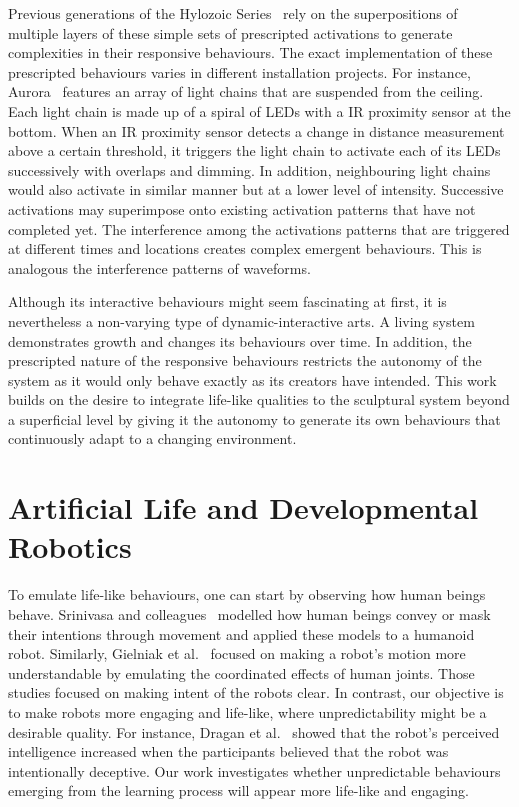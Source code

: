 Previous generations of the Hylozoic Series~\cite{Beesley2012} rely on the superpositions of multiple layers of these simple sets of prescripted activations to generate complexities in their responsive behaviours. The exact implementation of these prescripted behaviours varies in different installation projects. For instance, Aurora~\cite{PBAI-Simon} features an array of light chains that are suspended from the ceiling. Each light chain is made up of a spiral of LEDs with a IR proximity sensor at the bottom. When an IR proximity sensor detects a change in distance measurement above a certain threshold, it triggers the light chain to activate each of its LEDs successively with overlaps and dimming. In addition, neighbouring light chains would also activate in similar manner but at a lower level of intensity. Successive activations may superimpose onto existing activation patterns that have not completed yet. The interference among the activations patterns that are triggered at different times and locations creates complex emergent behaviours. This is analogous the interference patterns of waveforms. 

Although its interactive behaviours might seem fascinating at first, it is nevertheless a non-varying type of dynamic-interactive arts. A living system demonstrates growth and changes its behaviours over time. In addition, the prescripted nature of the responsive behaviours restricts the autonomy of the system as it would only behave exactly as its creators have intended. This work builds on the desire to integrate life-like qualities to the sculptural system beyond a superficial level by giving it the autonomy to generate its own behaviours that continuously adapt to a changing environment.



\section{Artificial Life and Developmental Robotics}

To emulate life-like behaviours, one can start by observing how human beings behave. Srinivasa and colleagues~\cite{Dragan2015}\cite{AncaDraga2014} modelled how human beings convey or mask their intentions through movement and applied these models to a humanoid robot. Similarly, Gielniak et al.~\cite{Gielniak2013} focused on making a robot's motion more understandable by emulating the coordinated effects of human joints. Those studies focused on making intent of the robots clear. In contrast, our objective is to make robots more engaging and life-like, where unpredictability might be a desirable quality. For instance, Dragan et al.~\cite{AncaDraga2014} showed that the robot's perceived intelligence increased when the participants believed that the robot was intentionally deceptive. Our work investigates whether unpredictable behaviours emerging from the learning process will appear more life-like and engaging.

